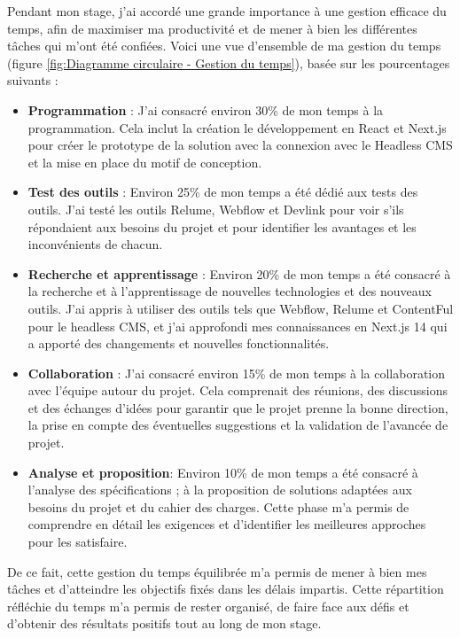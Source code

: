 Pendant mon stage, j'ai accordé une grande importance à une gestion efficace du temps, afin de maximiser ma productivité et de mener à bien les différentes tâches qui m'ont été confiées. Voici une vue d'ensemble de ma gestion du temps (figure \ref{fig:Diagramme circulaire - Gestion du temps}), basée sur les pourcentages suivants :

\begin{itemize}
\item \textbf{Programmation} : J'ai consacré environ 30\% de mon temps à la programmation. Cela inclut la création le développement en React et Next.js pour créer le prototype de la solution avec la connexion avec le Headless CMS et la mise en place du motif de conception.

\item \textbf{Test des outils} : Environ 25\% de mon temps a été dédié aux tests des outils. J'ai testé les outils Relume, Webflow et Devlink pour voir s'ils répondaient aux besoins du projet et pour identifier les avantages et les inconvénients de chacun.

\item \textbf{Recherche et apprentissage} : Environ 20\% de mon temps a été consacré à la recherche et à l'apprentissage de nouvelles technologies et des nouveaux outils. J'ai appris à utiliser des outils tels que Webflow, Relume et ContentFul pour le headless CMS, et j'ai approfondi mes connaissances en Next.js 14 qui a apporté des changements et nouvelles fonctionnalités.
\item \textbf{Collaboration} : J'ai consacré environ 15\% de mon temps à la collaboration avec l'équipe autour du projet. Cela comprenait des réunions, des discussions et des échanges d'idées pour garantir que le projet prenne la bonne direction, la prise en compte des éventuelles suggestions et la validation de l'avancée de projet.

\item \textbf{Analyse et proposition}: Environ 10\% de mon temps a été consacré à l'analyse des spécifications ; à la proposition de solutions adaptées aux besoins du projet et du cahier des charges. Cette phase m'a permis de comprendre en détail les exigences et d'identifier les meilleures approches pour les satisfaire.
\end{itemize}

De ce fait, cette gestion du temps équilibrée m'a permis de mener à bien mes tâches et d'atteindre les objectifs fixés dans les délais impartis. Cette répartition réfléchie du temps m'a permis de rester organisé, de faire face aux défis et d'obtenir des résultats positifs tout au long de mon stage.

